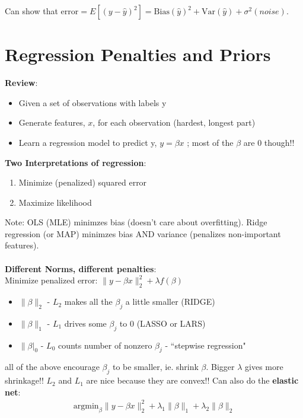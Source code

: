 \documentclass[a4paper]{article}\usepackage[]{graphicx}\usepackage[]{color}
\begin{document}
Can show that $\text{error} = E[(y-\hat{y})^2] = \text{Bias}(\hat{y})^2 + \text{Var}(\hat{y}) + \sigma^2 (noise)$.


\section{Regression Penalties and Priors}

\textbf{Review}: \\
\begin{itemize}
\item Given a set of observations with labels y
\item Generate features, $x$, for each observation (hardest, longest part)
\item Learn a regression model to predict y, $y=\beta x$ ; most of the $\beta$ are 0 though!!
\end{itemize}

\textbf{Two Interpretations of regression}: \\
\begin{enumerate}
\item Minimize (penalized) squared error
\item Maximize likelihood 
\end{enumerate}

Note: OLS (MLE) minimzes bias (doesn't care about overfitting). Ridge regression (or MAP) minimzes bias AND variance (penalizes non-important features). \\
\\
\textbf{Different Norms, different penalties}: \\
Minimize penalized error: $\lVert y-\beta x \rVert^2_2 + \lambda f(\beta)$
\begin{itemize}
\item $\lVert \beta \rVert_2 $ - $L_2$ makes all the $\beta_j$ a little smaller (RIDGE)
\item $\lVert \beta \rVert_1$ - $L_1$ drives some $\beta_j$ to 0 (LASSO or LARS)
\item $\lVert \beta \rvert_0$ - $L_0$ counts number of nonzero $\beta_j$ - ``stepwise regression"
\end{itemize}

all of the above encourage $\beta_j$ to be smaller, ie. shrink $\beta$. Bigger $\lambda$ gives more shrinkage!! $L_2$ and $L_1$ are nice because they are convex!! Can also do the \textbf{elastic net}:
\begin{align*}
\text{argmin}_{\beta} \lVert y - \beta x\rVert^2_2 + \lambda_1 \lVert \beta \rVert_1 + \lambda_2 \lVert \beta \rVert_2
\end{align*}
\end{document}
